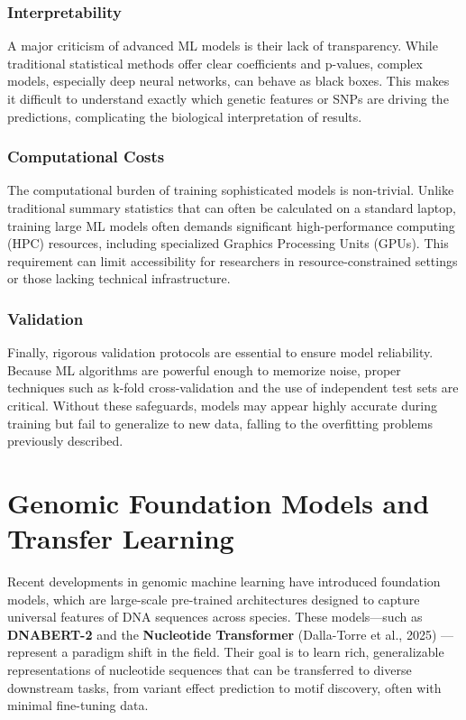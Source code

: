 \subsubsection{Interpretability}

A major criticism of advanced ML models is their lack of transparency. While traditional statistical methods offer clear coefficients and p-values, complex models, especially deep neural networks, can behave as black boxes. This makes it difficult to understand exactly which genetic features or SNPs are driving the predictions, complicating the biological interpretation of results.

\subsubsection{Computational Costs}

The computational burden of training sophisticated models is non-trivial. Unlike traditional summary statistics that can often be calculated on a standard laptop, training large ML models often demands significant high-performance computing (HPC) resources, including specialized Graphics Processing Units (GPUs). This requirement can limit accessibility for researchers in resource-constrained settings or those lacking technical infrastructure.

\subsubsection{Validation}

Finally, rigorous validation protocols are essential to ensure model reliability. Because ML algorithms are powerful enough to memorize noise, proper techniques such as k-fold cross-validation and the use of independent test sets are critical. Without these safeguards, models may appear highly accurate during training but fail to generalize to new data, falling to the overfitting problems previously described.

\section{Genomic Foundation Models and Transfer Learning}

Recent developments in genomic machine learning have introduced foundation models, which are large-scale pre-trained architectures designed to capture universal features of DNA sequences across species. These models—such as \textbf{DNABERT-2} \cite{zhou2024dnabert} and the \textbf{Nucleotide Transformer} (Dalla-Torre et al., 2025) \cite{dallatorre2025nucleotide}—represent a paradigm shift in the field. Their goal is to learn rich, generalizable representations of nucleotide sequences that can be transferred to diverse downstream tasks, from variant effect prediction to motif discovery, often with minimal fine-tuning data.

